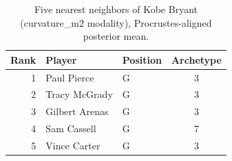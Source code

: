 \begin{table}[htbp]
  \centering\small
  \begin{tabular}{rllc}
    \toprule
    Rank & Player & Position & Archetype \\
    \midrule
    1 & Paul Pierce & G & 3 \\
    2 & Tracy McGrady & G & 3 \\
    3 & Gilbert Arenas & G & 3 \\
    4 & Sam Cassell & G & 7 \\
    5 & Vince Carter & G & 3 \\
    \bottomrule
  \end{tabular}
  \caption{Five nearest neighbors of Kobe Bryant (curvature_m2 modality), Procrustes-aligned posterior mean.}
  \label{tab:Kobe_Bryant_neighbors_curvature_m2}
\end{table}

